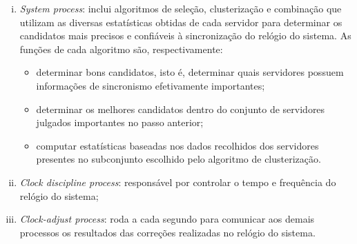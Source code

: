 \begin {enumerate}[i.]
	O \textit{poll process} é responsável, por sua vez, por enviar pacotes aos
	servidores a cada intervalo de \(2^\tau\) segundos. \(\tau\) varia de 3 a 17,
	resultando, assim, em intervalos de 8 segundos a 36 horas. O valor de \(\tau\)
	pode variar durante a execução, sendo modificado pelo algoritmo regulador do
	relógio, que será discutido posteriormente. 
	
	\item \textit{System process}: inclui algoritmos de seleção, clusterização e
	combinação que utilizam as diversas estatísticas obtidas de cada servidor para
	determinar os candidatos mais precisos e confiáveis à sincronização do relógio
	do sistema. As funções de cada algoritmo são, respectivamente:
		
		\begin{itemize}
  		  \renewcommand\labelitemi{--}
  		  \item determinar bons candidatos, isto é, determinar quais servidores
  		  possuem informações de sincronismo efetivamente importantes;
  		  \item determinar os melhores candidatos dentro do conjunto de servidores
  		  julgados importantes no passo anterior;
  		  \item computar estatísticas baseadas nos dados recolhidos dos servidores
  		  presentes no subconjunto escolhido pelo algoritmo de clusterização.
  		\end{itemize}
  	
  	\item \textit{Clock discipline process}: responsável por controlar o tempo e
  	frequência do relógio do sistema;
  	
  	\item \textit{Clock-adjust process}: roda a cada segundo para comunicar aos
  	demais processos os resultados das correções realizadas no relógio do
  	sistema.
  	
\end{enumerate}

